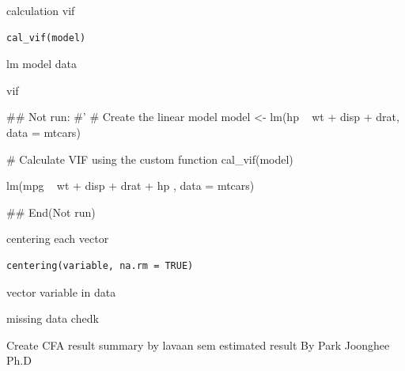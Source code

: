 \documentclass[a4paper]{book}
\begin{document}
%
\begin{Description}
calculation vif
\end{Description}
%
\begin{Usage}
\begin{verbatim}
cal_vif(model)
\end{verbatim}
\end{Usage}
%
\begin{Arguments}
\begin{ldescription}
\item[\code{model}] lm model data
\end{ldescription}
\end{Arguments}
%
\begin{Value}
vif
\end{Value}
%
\begin{Examples}
\begin{ExampleCode}

## Not run: 
#'
# Create the linear model
model <- lm(hp ~ wt + disp + drat, data = mtcars)

# Calculate VIF using the custom function
cal_vif(model)

lm(mpg ~ wt + disp + drat + hp , data = mtcars) %



## End(Not run)
\end{ExampleCode}
\end{Examples}
%
\begin{Description}
centering each vector
\end{Description}
%
\begin{Usage}
\begin{verbatim}
centering(variable, na.rm = TRUE)
\end{verbatim}
\end{Usage}
%
\begin{Arguments}
\begin{ldescription}
\item[\code{variable}] vector variable in data

\item[\code{na.rm}] missing data chedk
\end{ldescription}
\end{Arguments}
%
\begin{Description}
Create CFA result summary by lavaan sem estimated result By Park Joonghee Ph.D
\end{Description}
\end{document}
